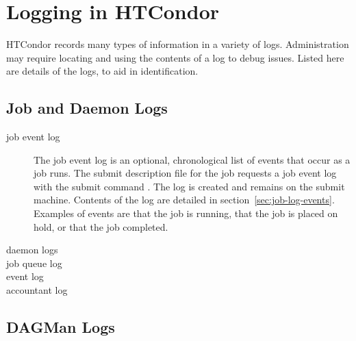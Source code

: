 \section{\label{sec:logging}Logging in HTCondor}
HTCondor records many types of information in a variety of logs.
Administration may require locating and using the
contents of a log to debug issues.
Listed here are details of the logs, to aid in identification.

\subsection{\label{sec:job-systemlogs}Job and Daemon Logs}
\begin{description}
\item[job event log]
  The job event log is an optional, chronological list of events that occur
  as a job runs.
  The submit description file for the job requests a job event log with
  the submit command .
  The log is created and remains on the submit machine.
  Contents of the log are detailed in section~\ref{sec:job-log-events}.
  Examples of events are that the job is running,
  that the job  is placed on hold, or that the job completed.
\item[daemon logs]
\item[job queue log]
\item[event log]
\item[accountant log]
\end{description}
\MoreTodo

\subsection{\label{sec:DAGMan-logs}DAGMan Logs}
\MoreTodo

